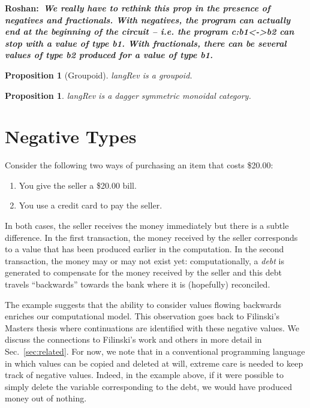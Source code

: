 \documentclass[preprint]{sigplanconf}
\newcommand{\xcomment}[2]{\textbf{#1:~\textsl{#2}}}
\newcommand{\roshan}[1]{\xcomment{Roshan}{#1}}
\newtheorem{proposition}[theorem]{Proposition}
\begin{document}
{\roshan{We really have to rethink this prop in the presence of
  negatives and fractionals. With negatives, the program can actually
  end at the beginning of the circuit -- i.e. the program {{c:b1<->b2}}
  can stop with a value of type {{b1}}. With fractionals, there can be
  several values of type {{b2}} produced for a value of type {{b1}}. }

\begin{proposition}[Groupoid]
\label{prop:groupoid}
{{langRev}} is a groupoid. 
\end{proposition}

\begin{proposition}
\label{prop:category}
{{langRev}} is a dagger symmetric monoidal category. 
\end{proposition}

\section{Negative Types}
\label{sec:neg}

Consider the following two ways of purchasing an item that costs \$20.00:
\begin{enumerate}
\item You give the seller a \$20.00 bill.
\item You use a credit card to pay the seller.
\end{enumerate}
In both cases, the seller receives the money immediately but there is a
subtle difference. In the first transaction, the money received by the seller
corresponds to a value that has been produced earlier in the computation. In
the second transaction, the money may or may not exist yet: computationally,
a \emph{debt} is generated to compensate for the money received by the seller
and this debt travels ``backwards'' towards the bank where it is (hopefully)
reconciled.

The example suggests that the ability to consider values flowing backwards
enriches our computational model. This observation goes back to Filinski's
Masters thesis where continuations are identified with these negative values.
We discuss the connections to Filinski's work and others in more detail in
Sec.~\ref{sec:related}. For now, we note that in a conventional programming
language in which values can be copied and deleted at will, extreme care is
needed to keep track of negative values. Indeed, in the example above, if it
were possible to simply delete the variable corresponding to the debt, we
would have produced money out of nothing. 

}
\end{document}
